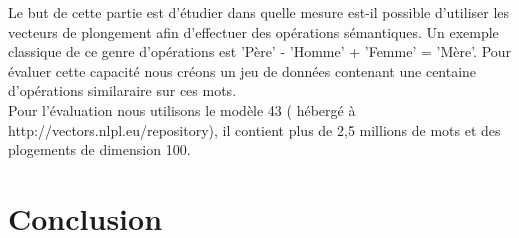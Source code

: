 \documentclass[12pt]{article}
\begin{document}
Le but de cette partie est d'étudier dans quelle mesure est-il possible d'utiliser les vecteurs
de plongement afin d'effectuer des opérations sémantiques. Un exemple classique de ce genre d'opérations est
'Père' - 'Homme' + 'Femme' = 'Mère'. Pour évaluer cette capacité nous créons un jeu de données contenant une 
centaine d'opérations similaraire sur ces mots. \\
Pour l'évaluation nous utilisons le modèle 43 ( hébergé à http://vectors.nlpl.eu/repository), il contient 
plus de 2,5 millions de mots et des plogements de dimension 100.  


\section{Conclusion}
\end{document}
